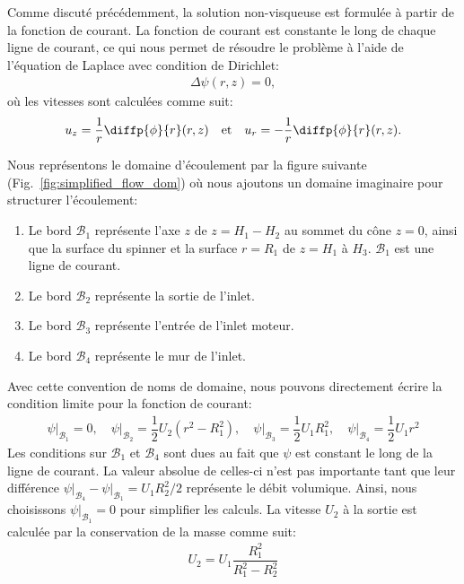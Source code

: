 \documentclass[12pt]{book}
\theoremstyle{bfnote}
\theoremstyle{bfnote}
\begin{document}
Comme discuté précédemment, la solution non-visqueuse est formulée à partir de la fonction de courant. La fonction de courant est constante le long de chaque ligne de courant, ce qui nous permet de résoudre le problème à l'aide de l'équation de Laplace avec condition de Dirichlet:
\begin{align}
    \Delta \psi(r, z) = 0,
\end{align}
où les vitesses sont calculées comme suit:
\begin{align}
    u_z = \dfrac{1}{r} \diffp{\phi}{r}(r,z) \quad \text{et} \quad u_r = - \dfrac{1}{r} \diffp{\phi}{r}(r, z).
\end{align}

Nous représentons le domaine d'écoulement par la figure suivante (Fig.~\ref{fig:simplified_flow_dom}) où nous ajoutons un domaine imaginaire pour structurer l'écoulement:
\begin{enumerate}
    \item Le bord $\mathscr{B}_1$ représente l'axe $z$ de $z = H_1 - H_2$ au sommet du cône $z = 0$, ainsi que la surface du spinner et la surface $r = R_1$ de $z = H_1$ à $H_3$. $\mathscr{B}_1$ est une ligne de courant.
    \item Le bord $\mathscr{B}_2$ représente la sortie de l'inlet.
    \item Le bord $\mathscr{B}_3$ représente l'entrée de l'inlet moteur.
    \item Le bord $\mathscr{B}_4$ représente le mur de l'inlet.
\end{enumerate}

Avec cette convention de noms de domaine, nous pouvons directement écrire la condition limite pour la fonction de courant:
\begin{align}
    \left. \psi \right|_{\mathscr{B}_1} = 0, \quad \left. \psi \right|_{\mathscr{B}_2} = \dfrac{1}{2} U_2 \left( r^2 - R_1^2 \right), \quad \left. \psi \right|_{\mathscr{B}_3} = \dfrac{1}{2} U_1 R_1^2, \quad \left. \psi \right|_{\mathscr{B}_4} = \dfrac{1}{2} U_1 r^2
\end{align}
Les conditions sur $\mathscr{B}_1$ et $\mathscr{B}_4$ sont dues au fait que $\psi$ est constant le long de la ligne de courant. La valeur absolue de celles-ci n'est pas importante tant que leur différence $\left. \psi \right|_{\mathscr{B}_4} - \left. \psi \right|_{\mathscr{B}_1} = U_1 R_2^2/2$ représente le débit volumique. Ainsi, nous choisissons $\left. \psi \right|_{\mathscr{B}_1} = 0$ pour simplifier les calculs. La vitesse $U_2$ à la sortie est calculée par la conservation de la masse comme suit:
\begin{align}
    U_2 = U_1 \dfrac{R_1^2}{R_1^2 - R_2^2}
\end{align}
\end{document}
